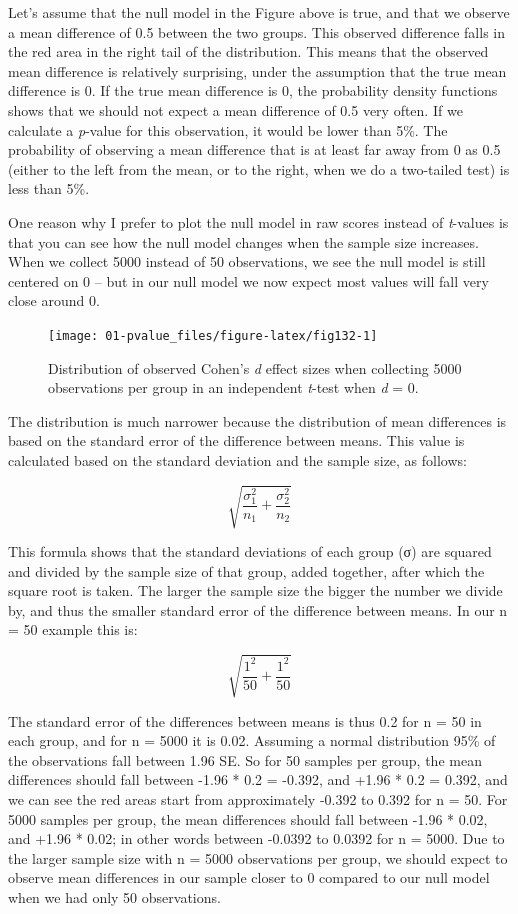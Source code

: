 \documentclass[
  oneside]{book}
\begin{document}
Let's assume that the null model in the Figure above is true, and that we observe a mean difference of 0.5 between the two groups. This observed difference falls in the red area in the right tail of the distribution. This means that the observed mean difference is relatively surprising, under the assumption that the true mean difference is 0. If the true mean difference is 0, the probability density functions shows that we should not expect a mean difference of 0.5 very often. If we calculate a \emph{p}-value for this observation, it would be lower than 5\%. The probability of observing a mean difference that is at least far away from 0 as 0.5 (either to the left from the mean, or to the right, when we do a two-tailed test) is less than 5\%.

One reason why I prefer to plot the null model in raw scores instead of \emph{t}-values is that you can see how the null model changes when the sample size increases. When we collect 5000 instead of 50 observations, we see the null model is still centered on 0 -- but in our null model we now expect most values will fall very close around 0.



\begin{figure}

{\centering \texttt{[image: 01-pvalue\_files/figure-latex/fig132-1]} 

}

\caption{Distribution of observed Cohen's \emph{d} effect sizes when collecting 5000 observations per group in an independent \emph{t}-test when \emph{d} = 0.}\label{fig:fig132}
\end{figure}

The distribution is much narrower because the distribution of mean differences is based on the standard error of the difference between means. This value is calculated based on the standard deviation and the sample size, as follows:

\[\sqrt{\frac{\sigma_{1}^{2}}{n_{1}}+\frac{\sigma_{2}^{2}}{n_{2}}}\]

This formula shows that the standard deviations of each group (σ) are squared and divided by the sample size of that group, added together, after which the square root is taken. The larger the sample size the bigger the number we divide by, and thus the smaller standard error of the difference between means. In our n = 50 example this is:

\[\sqrt{\frac{1^{2}}{50}+\frac{1^{2}}{50}}\]

The standard error of the differences between means is thus 0.2 for n = 50 in each group, and for n = 5000 it is 0.02. Assuming a normal distribution 95\% of the observations fall between 1.96 SE. So for 50 samples per group, the mean differences should fall between -1.96 * 0.2 = -0.392, and +1.96 * 0.2 = 0.392, and we can see the red areas start from approximately -0.392 to 0.392 for n = 50. For 5000 samples per group, the mean differences should fall between -1.96 * 0.02, and +1.96 * 0.02; in other words between -0.0392 to 0.0392 for n = 5000. Due to the larger sample size with n = 5000 observations per group, we should expect to observe mean differences in our sample closer to 0 compared to our null model when we had only 50 observations.
\end{document}
